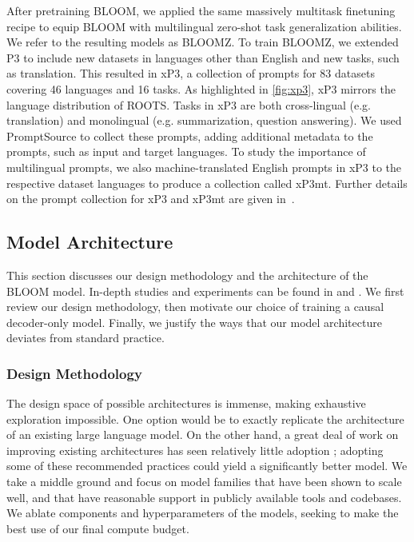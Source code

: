 After pretraining BLOOM, we applied the same massively multitask finetuning recipe to equip BLOOM with multilingual zero-shot task generalization abilities. We refer to the resulting models as BLOOMZ. To train BLOOMZ, we extended P3 to include new datasets in languages other than English and new tasks, such as translation. This resulted in xP3, a collection of prompts for 83 datasets covering 46 languages and 16 tasks. As highlighted in \ref{fig:xp3}, xP3 mirrors the language distribution of ROOTS. Tasks in xP3 are both cross-lingual (e.g. translation) and monolingual (e.g. summarization, question answering). We used PromptSource to collect these prompts, adding additional metadata to the prompts, such as input and target languages. To study the importance of multilingual prompts, we also machine-translated English prompts in xP3 to the respective dataset languages to produce a collection called xP3mt. Further details on the prompt collection for xP3 and xP3mt are given in~\cite{muennighoff2022crosslingual}.

\subsection{Model Architecture}
\label{sec:modeling}

This section discusses our design methodology and the architecture of the BLOOM model. In-depth studies and experiments can be found in \citet{scao2022what} and \citet{wang2022what}. We first review our design methodology, then motivate our choice of training a causal decoder-only model. Finally, we justify the ways that our model architecture deviates from standard practice.

\subsubsection{Design Methodology}

The design space of possible architectures is immense, making exhaustive exploration impossible. One option would be to exactly replicate the architecture of an existing large language model. On the other hand, a great deal of work on improving existing architectures has seen relatively little adoption \citep{narang2021transformer}; adopting some of these recommended practices could yield a significantly better model. We take a middle ground and focus on model families that have been shown to scale well, and that have reasonable support in publicly available tools and codebases. We ablate components and hyperparameters of the models, seeking to make the best use of our final compute budget.

